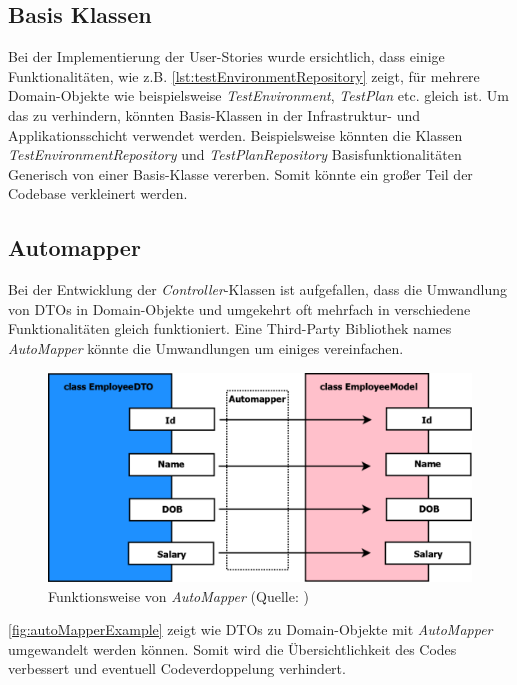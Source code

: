 \documentclass[a4paper, fontsize=11pt, parskip=half, twoside]{scrreprt}
\begin{document}
	\subsection{Basis Klassen}
	Bei der Implementierung der User-Stories wurde ersichtlich, dass einige Funktionalitäten, wie z.B. \autoref{lst:testEnvironmentRepository} zeigt, für mehrere Domain-Objekte wie beispielsweise \emph{TestEnvironment}, \emph{TestPlan} etc. gleich ist.
	Um das zu verhindern, könnten Basis-Klassen in der Infrastruktur- und Applikationsschicht verwendet werden.
	Beispielsweise könnten die Klassen \emph{TestEnvironmentRepository} und \emph{TestPlanRepository} Basisfunktionalitäten Generisch von einer Basis-Klasse vererben.
	Somit könnte ein großer Teil der Codebase verkleinert werden.
	
	\subsection{Automapper}
	Bei der Entwicklung der \emph{Controller}-Klassen ist aufgefallen, dass die Umwandlung von \ac{DTO}s in Domain-Objekte und umgekehrt oft mehrfach in verschiedene Funktionalitäten gleich funktioniert.
	Eine Third-Party Bibliothek names \emph{AutoMapper} könnte die Umwandlungen um einiges vereinfachen. \textcite{noauthor_automapper_nodate}
	
	\begin{figure}[ht]
		\centering
		\includegraphics[scale=0.3]{assets/AutoMapper_example.png}
		\caption{Funktionsweise von \emph{AutoMapper} (Quelle: \textcite{sanjay_implement_2020})}
		\label{fig:autoMapperExample}
	\end{figure}

	\autoref{fig:autoMapperExample} zeigt wie \ac{DTO}s zu Domain-Objekte mit \emph{AutoMapper} umgewandelt werden können.
	Somit wird die Übersichtlichkeit des Codes verbessert und eventuell Codeverdoppelung verhindert.
	
\end{document}
